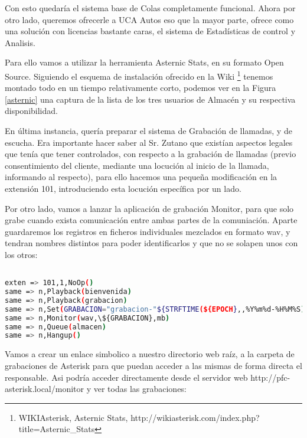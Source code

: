 Con esto quedaría el sistema base de Colas completamente funcional. Ahora por otro lado, queremos ofrecerle a UCA Autos eso que la mayor parte, ofrece como una solución con licencias bastante caras, el sistema de Estadísticas de control y Analisis.

Para ello vamos a utilizar la herramienta Asternic Stats, en su formato Open Source. Siguiendo el esquema de instalación ofrecido en la Wiki \footnote{WIKIAsterisk, Asternic Stats, http://wikiasterisk.com/index.php?title=Asternic\_Stats} tenemos montado todo en un tiempo relativamente corto, podemos ver en la Figura \ref{asternic} una captura de la lista de los tres usuarios de Almacén y su respectiva disponibilidad. 


En última instancia, quería preparar el sistema de Grabación de llamadas, y de escucha. Era importante hacer saber al Sr. Zutano que existían aspectos legales que tenía que tener controlados, con respecto a la grabación de llamadas (previo consentimiento del cliente, mediante una locución al inicio de la llamada, informando al respecto), para ello hacemos una pequeña modificación en la extensión 101, introduciendo esta locución específica por un lado.

Por otro lado, vamos a lanzar la aplicación de grabación Monitor, para que solo grabe cuando exista comunicación entre ambas partes de la comuniación. Aparte guardaremos los registros en ficheros individuales mezclados en formato wav, y tendran nombres distintos para poder identificarlos y que no se solapen unos con los otros:

\begin{lstlisting}[language=bash,title={/etc/asterisk/extensions.conf}]

exten => 101,1,NoOp()
same => n,Playback(bienvenida)
same => n,Playback(grabacion)
same => n,Set(GRABACION="grabacion-"${STRFTIME(${EPOCH},,%Y%m%d-%H%M%S)})
same => n,Monitor(wav,\${GRABACION},mb)
same => n,Queue(almacen)
same => n,Hangup()

\end{lstlisting}

Vamos a crear un enlace simbolico a nuestro directorio web raíz, a la carpeta de grabaciones de Asterisk para que puedan acceder a las mismas de forma directa el responsable. Asi podría acceder directamente desde el servidor web http://pfc-asterisk.local/monitor y ver todas las grabaciones:

